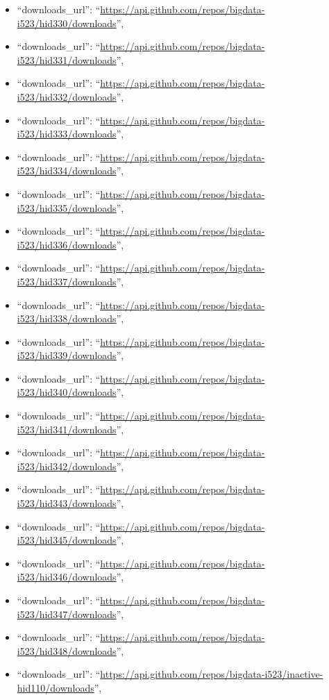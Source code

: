 \begin{itemize}
\item
  ``downloads\_url'':
  ``\url{https://api.github.com/repos/bigdata-i523/hid330/downloads}'',
\item
  ``downloads\_url'':
  ``\url{https://api.github.com/repos/bigdata-i523/hid331/downloads}'',
\item
  ``downloads\_url'':
  ``\url{https://api.github.com/repos/bigdata-i523/hid332/downloads}'',
\item
  ``downloads\_url'':
  ``\url{https://api.github.com/repos/bigdata-i523/hid333/downloads}'',
\item
  ``downloads\_url'':
  ``\url{https://api.github.com/repos/bigdata-i523/hid334/downloads}'',
\item
  ``downloads\_url'':
  ``\url{https://api.github.com/repos/bigdata-i523/hid335/downloads}'',
\item
  ``downloads\_url'':
  ``\url{https://api.github.com/repos/bigdata-i523/hid336/downloads}'',
\item
  ``downloads\_url'':
  ``\url{https://api.github.com/repos/bigdata-i523/hid337/downloads}'',
\item
  ``downloads\_url'':
  ``\url{https://api.github.com/repos/bigdata-i523/hid338/downloads}'',
\item
  ``downloads\_url'':
  ``\url{https://api.github.com/repos/bigdata-i523/hid339/downloads}'',
\item
  ``downloads\_url'':
  ``\url{https://api.github.com/repos/bigdata-i523/hid340/downloads}'',
\item
  ``downloads\_url'':
  ``\url{https://api.github.com/repos/bigdata-i523/hid341/downloads}'',
\item
  ``downloads\_url'':
  ``\url{https://api.github.com/repos/bigdata-i523/hid342/downloads}'',
\item
  ``downloads\_url'':
  ``\url{https://api.github.com/repos/bigdata-i523/hid343/downloads}'',
\item
  ``downloads\_url'':
  ``\url{https://api.github.com/repos/bigdata-i523/hid345/downloads}'',
\item
  ``downloads\_url'':
  ``\url{https://api.github.com/repos/bigdata-i523/hid346/downloads}'',
\item
  ``downloads\_url'':
  ``\url{https://api.github.com/repos/bigdata-i523/hid347/downloads}'',
\item
  ``downloads\_url'':
  ``\url{https://api.github.com/repos/bigdata-i523/hid348/downloads}'',
\item
  ``downloads\_url'':
  ``\url{https://api.github.com/repos/bigdata-i523/inactive-hid110/downloads}'',

\end{itemize}
